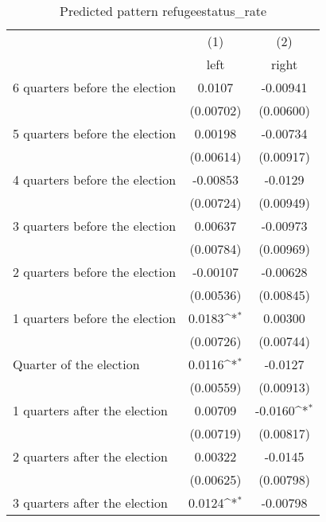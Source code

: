 \begin{table}[htbp]\centering
\def\sym#1{\ifmmode^{#1}\else\(^{#1}\)\fi}
\caption{Predicted pattern refugeestatus\_rate}
\begin{tabular}{l*{2}{c}}
\hline\hline
                    &\multicolumn{1}{c}{(1)}&\multicolumn{1}{c}{(2)}\\
                    &\multicolumn{1}{c}{left}&\multicolumn{1}{c}{right}\\
\hline
 6 quarters before the election&      0.0107         &    -0.00941         \\
                    &   (0.00702)         &   (0.00600)         \\
[1em]
 5 quarters before the election&     0.00198         &    -0.00734         \\
                    &   (0.00614)         &   (0.00917)         \\
[1em]
 4 quarters before the election&    -0.00853         &     -0.0129         \\
                    &   (0.00724)         &   (0.00949)         \\
[1em]
 3 quarters before the election&     0.00637         &    -0.00973         \\
                    &   (0.00784)         &   (0.00969)         \\
[1em]
 2 quarters before the election&    -0.00107         &    -0.00628         \\
                    &   (0.00536)         &   (0.00845)         \\
[1em]
 1 quarters before the election&      0.0183\sym{*}  &     0.00300         \\
                    &   (0.00726)         &   (0.00744)         \\
[1em]
Quarter of the election&      0.0116\sym{*}  &     -0.0127         \\
                    &   (0.00559)         &   (0.00913)         \\
[1em]
 1 quarters after the election&     0.00709         &     -0.0160\sym{*}  \\
                    &   (0.00719)         &   (0.00817)         \\
[1em]
 2 quarters after the election&     0.00322         &     -0.0145         \\
                    &   (0.00625)         &   (0.00798)         \\
[1em]
 3 quarters after the election&      0.0124\sym{*}  &    -0.00798         \\

\end{tabular}
\end{table}
